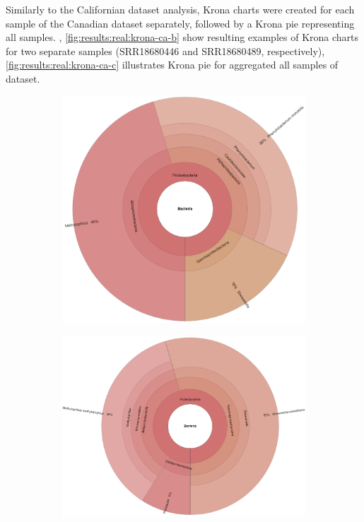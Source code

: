     Similarly to the Californian dataset analysis, Krona charts were created for each sample of the Canadian dataset separately, followed by a Krona pie representing all samples. , \ref{fig:results:real:krona-ca-b} show resulting examples of Krona charts for two separate samples (SRR18680446 and SRR18680489, respectively), \cref{fig:results:real:krona-ca-c} illustrates Krona pie for aggregated all samples of dataset.
    \begin{figure}[ht!]
        \centering
        \begin{subfigure}[b]{0.3\textwidth}
        \includegraphics[width=1\textwidth]{figures/results/real/krona/krona-ca-sSRR18680446.png}
        \label{fig:results:real:krona-ca-a}
        \end{subfigure}
        \hfill
        \begin{subfigure}[b]{0.3\textwidth}
        \includegraphics[width=1\textwidth]{figures/results/real/krona/krona-ca-sSRR18680489.png}

\end{subfigure}
\end{figure}
